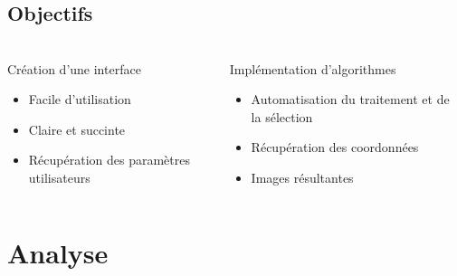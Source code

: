 \documentclass[11pt]{beamer}
\begin{document}
\subsection{Objectifs}
\begin{frame}
\frametitle{\subsecname}
	\begin{columns}[t]
		
		\begin{column}{4.5cm}
			\begin{block}{Création d'une interface}
				\begin{itemize}
					\item Facile d'utilisation
					\item Claire et succinte
					\item Récupération des paramètres utilisateurs
				\end{itemize}
			\end{block}
		\end{column}
		\begin{column}{6.5cm}
		    \begin{block}{Implémentation d'algorithmes}
				\begin{itemize}
					\item Automatisation du traitement et de la sélection
					\item Récupération des coordonnées
					\item Images résultantes
				\end{itemize}
			\end{block}
		\end{column}
	\end{columns}
\end{frame}

\section{Analyse}
\end{document}
